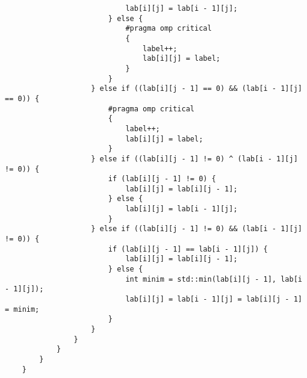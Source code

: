 \documentclass{report}
\begin{document}
\begin{lstlisting}
                            lab[i][j] = lab[i - 1][j];
                        } else {
                            #pragma omp critical
                            {
                                label++;
                                lab[i][j] = label;
                            }
                        }
                    } else if ((lab[i][j - 1] == 0) && (lab[i - 1][j] == 0)) {
                        #pragma omp critical
                        {
                            label++;
                            lab[i][j] = label;
                        }
                    } else if ((lab[i][j - 1] != 0) ^ (lab[i - 1][j] != 0)) {
                        if (lab[i][j - 1] != 0) {
                            lab[i][j] = lab[i][j - 1];
                        } else {
                            lab[i][j] = lab[i - 1][j];
                        }
                    } else if ((lab[i][j - 1] != 0) && (lab[i - 1][j] != 0)) {
                        if (lab[i][j - 1] == lab[i - 1][j]) {
                            lab[i][j] = lab[i][j - 1];
                        } else {
                            int minim = std::min(lab[i][j - 1], lab[i - 1][j]);
                            lab[i][j] = lab[i - 1][j] = lab[i][j - 1] = minim;
                        }
                    }
                }
            }
        }
    }


\end{lstlisting}
\end{document}

